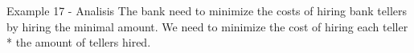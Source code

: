 \begin{frame}{Example 17 - Analisis}
The bank need to minimize the costs of hiring bank tellers by
hiring the minimal amount. We need to minimize the cost
of hiring each teller * the amount of tellers hired.

\end{frame}
